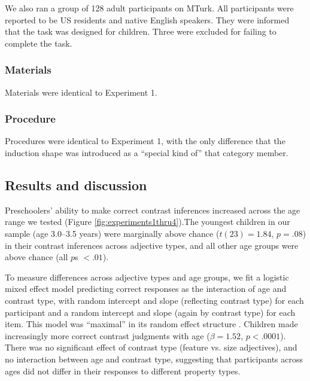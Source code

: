 \documentclass[man]{apa2}
\begin{document}
We also ran a group of 128 adult participants on MTurk.  All participants were reported to be US residents and native English speakers.  They were informed that the task was designed for children. Three were excluded for failing to complete the task. 

\subsubsection{Materials}

Materials were identical to Experiment 1.

\subsubsection{Procedure}

Procedures were identical to Experiment 1, with the only difference that the induction shape was introduced as a ``special kind of'' that category member.

\subsection{Results and discussion}


Preschoolers' ability to make correct contrast inferences increased across the age range we tested (Figure \ref{fig:experiments1thru4}).The youngest children in our sample (age 3.0--3.5 years) were marginally above chance ($t(23) = 1.84$, $p = .08$) in their contrast inferences across adjective types, and all other age groups were above chance (all $p$s $< .01$).



To measure differences across adjective types and age groups, we fit a logistic mixed effect model predicting correct responses as the interaction of age and contrast type, with random intercept and slope (reflecting contrast type) for each participant and a random intercept and slope (again by contrast type) for each item. This model was ``maximal'' in its random effect structure \cite{barr2013}. Children made increasingly more correct contrast judgments with age ($\beta = 1.52$, $p < .0001$). There was no significant effect of contrast type (feature vs. size adjectives), and no interaction between age and contrast type, suggesting that participants across ages did not differ in their responses to different property types.  
\end{document}

